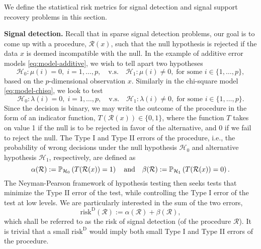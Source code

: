 We define the statistical risk metrics for signal detection and signal support recovery problems in this section.

{\bf Signal detection.}
Recall that in sparse signal detection problems, our goal is to come up with a procedure, $\mathcal{R}(x)$, such that the null hypothesis is rejected if the data $x$ is deemed incompatible with the null.
In the example of additive error models \eqref{eq:model-additive}, we wish to tell apart two hypotheses
\begin{equation} \label{eq:global-test-additive}
    \mathcal{H}_0: \mu(i) = 0, \;i=1,\ldots,p,
    \quad\text{v.s.}\quad 
    \mathcal{H}_1: \mu(i)\neq 0, \; \text{for some }i\in\{1,\ldots,p\},
\end{equation}
based on the $p$-dimensional observation $x$.
Similarly in the chi-square model \eqref{eq:model-chisq}, we look to test
\begin{equation} \label{eq:global-test-chisq}
    \mathcal{H}_0: \lambda(i) = 0, \;i=1,\ldots,p,
    \quad\text{v.s.}\quad 
    \mathcal{H}_1: \lambda(i)\neq 0, \; \text{for some }i\in\{1,\ldots,p\}.
\end{equation} 
Since the decision is binary, we may write the outcome of the procedure in the form of an indicator function, $T(\mathcal{R}(x))\in\{0,1\}$, where the function $T$ takes on value 1 if the null is to be rejected in favor of the alternative, and 0 if we fail to reject the null. 
The Type I and Type II errors of the procedure, i.e., the probability of wrong decisions under the null hypothesis $\mathcal{H}_0$ and alternative hypothesis $\mathcal{H}_1$, respectively, are defined as 
\begin{equation} \label{eq:type-II-error}
    \alpha(\mathcal{R}) := \P_{\mathcal{H}_0}\left(T(\mathcal{R}(x))=1\right)
    \quad \text{and} \quad
    \beta(\mathcal{R}) := \P_{\mathcal{H}_1}\left(T(\mathcal{R}(x))=0\right).
\end{equation}
The Neyman-Pearson framework of hypothesis testing then seeks tests that minimize the Type II error of the test, while controlling the Type I error of the test at low levels.
We are particularly interested in the sum of the two errors, 
\begin{equation} \label{eq:risk-detection}
    \mathrm{risk}^{\mathrm{D}}(\mathcal{R}) := \alpha(\mathcal{R}) + \beta(\mathcal{R}),
\end{equation}
which shall be referred to as the risk of signal detection (of the procedure $\mathcal{R}$).
It is trivial that a small $\mathrm{risk}^{\mathrm{D}}$ would imply both small Type I and Type II errors of the procedure.


